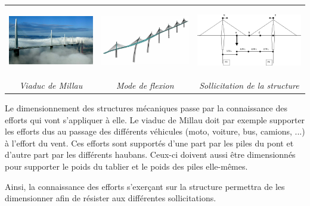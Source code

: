 \documentclass[10pt]{article}
\begin{document}



\vspace{.5cm}

\begin{center}
\begin{tabular}{ccc}
\includegraphics[height=3cm]{images/millau} &
\includegraphics[height=3cm]{images/millau2} &
\includegraphics[height=3cm]{images/millau3} \\
\textit{Viaduc de Millau \cite{millau1}} & \textit{Mode de flexion \cite{millau1}}&\textit{Sollicitation de la structure \cite{millau1}}\\
\end{tabular}
\end{center}

Le dimensionnement des structures mécaniques passe par la connaissance des efforts qui vont s'appliquer à elle. Le viaduc de Millau doit par exemple supporter les efforts dus au passage des différents véhicules (moto, voiture, bus, camions, ...) à l'effort du vent. Ces efforts sont supportés d'une part par les piles du pont et d'autre part par les différents haubans. Ceux-ci doivent aussi être dimensionnés pour supporter le poids du tablier et le poids des piles elle-mêmes.

Ainsi, la connaissance des efforts s'exerçant sur la structure permettra de les dimensionner afin de résister aux différentes sollicitations.

\vspace{.2cm}
\end{document}
